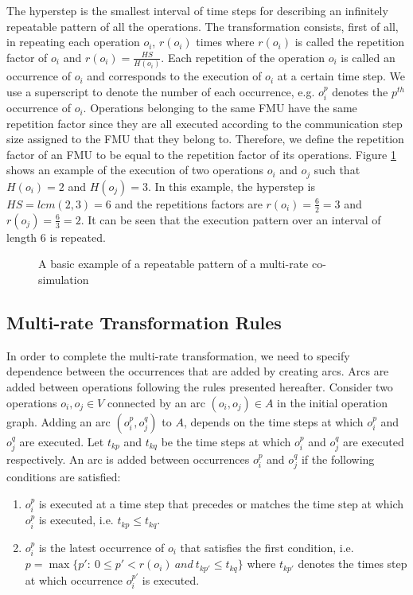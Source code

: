 The hyperstep is the smallest interval of time steps for describing an infinitely repeatable pattern of all the operations. The transformation consists, first of all, in repeating each operation $o_i$, $r(o_i)$ times where $r(o_i)$ is called the repetition factor of $o_i$ and $r(o_i) = \frac{HS}{H(o_i)}$. Each repetition of the operation $o_i$ is called an occurrence of $o_i$ and corresponds to the execution of $o_i$ at a certain time step. We use a superscript to denote the number of each occurrence, e.g. $o_i^p$ denotes the $p^{th}$ occurrence of $o_i$. Operations belonging to the same FMU have the same repetition factor since they are all executed according to the communication step size assigned to the FMU that they belong to. Therefore, we define the repetition factor of an FMU to be equal to the repetition factor of its operations. Figure \ref{fig:reppattern} shows an example of the execution of two operations $o_i$ and $o_j$ such that $H(o_i) = 2$ and $H(o_j) = 3$. In this example, the  hyperstep is $HS = lcm(2,3) = 6$ and the repetitions factors are $r(o_i) = \frac{6}{2} = 3$ and $r(o_j) = \frac{6}{3} = 2$. It can be seen that the execution pattern over an interval of length $6$ is repeated.

\begin{figure}[htb]
\centering
  
\caption{A basic example of a repeatable pattern of a multi-rate co-simulation}
\label{fig:reppattern}
\end{figure}

\subsection{Multi-rate Transformation Rules}

In order to complete the multi-rate transformation, we need to specify dependence between the occurrences that are added by creating arcs. Arcs are added between operations following the rules presented hereafter. Consider two operations $o_i, o_j \in V$ connected by an arc $(o_i,o_j) \in A$ in the initial operation graph. Adding an arc $(o_i^p,o_j^q)$ to $A$, depends on the time steps at which $o_i^p$ and $o_j^q$ are executed. Let $t_{kp}$ and $t_{kq}$ be the time steps at which $o_i^p$ and $o_j^q$ are executed respectively. An arc is added between occurrences $o_i^p$ and $o_j^q$ if the following conditions are satisfied:

\begin{enumerate}

\item $o_i^p$ is executed at a time step that precedes or matches the time step at which $o_i^p$ is executed, i.e. $t_{kp} \leq t_{kq}$.

\item $o_i^p$ is the latest occurrence of $o_i$ that satisfies the first condition, i.e. $p=\max\{p':\ 0 \leq p' < r(o_i)\ and\ t_{kp'} \leq t_{kq}\}$ where $t_{kp'}$ denotes the times step at which occurrence $o_i^{p'}$ is executed.  

\end{enumerate}

